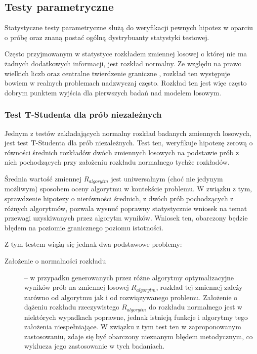 \documentclass[12pt,a4paper]{report}
\begin{document}
{{{{\subsection{Testy parametryczne}
\par{
Statystyczne testy parametryczne służą do weryfikacji pewnych hipotez w oparciu o próbę oraz znaną postać ogólną dystrybuanty statystyki testowej.
\par{
Często przyjmowanym w statystyce rozkładem zmiennej losowej o której nie ma żadnych dodatkowych informacji, jest rozkład normalny. Ze względu na prawo wielkich liczb oraz centralne twierdzenie graniczne \cite{centrallimit}, rozkład ten występuje bowiem w realnych problemach nadzwyczaj często. Rozkład ten jest więc często dobrym punktem wyjścia dla pierwszych badań nad modelem losowym.
}
\subsubsection{Test T-Studenta dla prób niezależnych}
\par{
Jednym z testów zakładających normalny rozkład badanych zmiennych losowych, jest test T-Studenta dla prób niezależnych. Test ten, weryfikuje hipotezę zerową o równości średnich rozkładów dwóch zmiennych losowych na podstawie prób z nich pochodzących przy założeniu rozkładu normalnego tychże rozkładów.
}
\par{
Średnia wartość zmiennej $R_{algorytm}$ jest uniwersalnym (choć nie jedynym możliwym) sposobem oceny algorytmu w kontekście problemu. W związku z tym, sprawdzenie hipotezy o nierówności średnich, z dwóch prób pochodzących z różnych algorytmów, pozwala wysnuć poprawny statystycznie wniosek na temat przewagi uzyskiwanych przez algorytm wyników. Wniosek ten, obarczony będzie błędem na poziomie granicznego poziomu istotności.
}
\par{
Z tym testem wiążą się jednak dwa podstawowe problemy:
\begin{description}
\item[Założenie o normalności rozkładu] -- w przypadku generowanych przez różne algorytmy optymalizacyjne wyników prób na zmiennej losowej $R_{algorytm}$, rozkład tej zmiennej zależy zarówno od algorytmu jak i od rozwiązywanego problemu. Założenie o dążeniu rozkładu rzeczywistego $R_{algorytm}$ do rozkładu normalnego jest w niektórych wypadkach poprawne, jednak istnieją funkcje i algorytmy tego założenia niespełniające. W związku z tym test ten  w zaproponowanym zastosowaniu, zdaje się być obarczony nieznanym błędem metodycznym, co wyklucza jego zastosowanie w tych badaniach.

\end{description}}}}}}}
\end{document}
